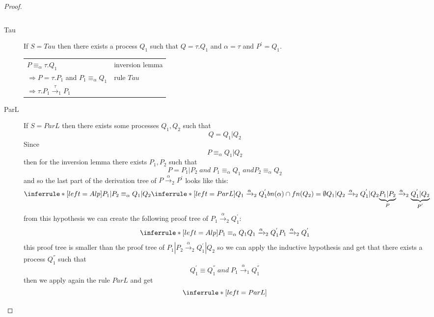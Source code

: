 \begin{theorem}
\begin{proof}
\begin{description}
\begin{center}
\begin{tabular}{ll}
		  \\
		  \end{tabular}
		\end{center}		
	  \item[Tau]
	    If $S=Tau$ then there exists a process $Q_{1}$ such that $Q=\tau.Q_{1}$ and $\alpha=\tau$ and $P^{'}=Q_{1}$. 
	    \begin{center}
	      \begin{tabular}{ll}
		$P\equiv_{\alpha}\tau.Q_{1}$&inversion lemma\\
		$\Rightarrow P=\tau.P_{1}$ and $P_{1}\equiv_{\alpha}Q_{1}$& rule $Tau$\\
		$\Rightarrow \tau.P_{1}\xrightarrow{\tau}_{1}P_{1}$& \\
	      \end{tabular}
	    \end{center}
	  \item[ParL]
	    If $S=ParL$ then there exists some processes $Q_{1},Q_{2}$ such that 
	    \[
	      Q=Q_{1}|Q_{2}
	    \]
	    Since 
	    \[
	      P\equiv_{\alpha}Q_{1}|Q_{2}
	    \]
	    then for the inversion lemma there exists $P_{1},P_{2}$ such that 
	    \[
	      P=P_{1}|P_{2}\; and\; P_{1}\equiv_{\alpha}Q_{1}\; and P_{2}\equiv_{\alpha}Q_{2}
	    \]
	    and so the last part of the derivation tree of $P\xrightarrow{\alpha}_{2}P^{'}$ looks like this:
	    \[
	      \inferrule* [left=Alp]{
		  P_{1}|P_{2}\equiv_{\alpha}Q_{1}|Q_{2}
		\\
		  \inferrule* [left=ParL]{
		      Q_{1}\xrightarrow{\alpha}_{2}Q_{1}^{'}
		    \\
		      bn(\alpha)\cap fn(Q_{2})=\emptyset
		  }{
		    Q_{1}|Q_{2}\xrightarrow{\alpha}_{2}Q_{1}^{'}|Q_{2}
		  }
	      }{
		\underbrace{P_{1}|P_{2}}_{P}\xrightarrow{\alpha}_{2}\underbrace{Q_{1}^{'}|Q_{2}}_{P^{'}}
	      }
	    \]
	    from this hypothesis we can create the following proof tree of $P_{1}\xrightarrow{\alpha}_{2}Q_{1}^{'}$:
	    \[
	      \inferrule* [left=Alp]{
		  P_{1}\equiv_{\alpha}Q_{1}
		\\
		  Q_{1}\xrightarrow{\alpha}_{2}Q_{1}^{'}
	      }{
		P_{1}\xrightarrow{\alpha}_{2}Q_{1}^{'}
	      }
	    \]
	    this proof tree is smaller than the proof tree of $P_{1}|P_{2}\xrightarrow{\alpha}_{2}Q_{1}^{'}|Q_{2}$ so we can apply the inductive hypothesis and get that there exists a process $Q_{1}^{''}$ such that
	    \[
	      Q_{1}^{'}\equiv Q_{1}^{''}\; and\; P_{1}\xrightarrow{\alpha}_{1}Q_{1}^{''} 
	    \]
	    then we apply again the rule $ParL$ and get 
	    \[
	      \inferrule* [left=ParL]{
}\]
\end{description}
\end{proof}
\end{theorem}
